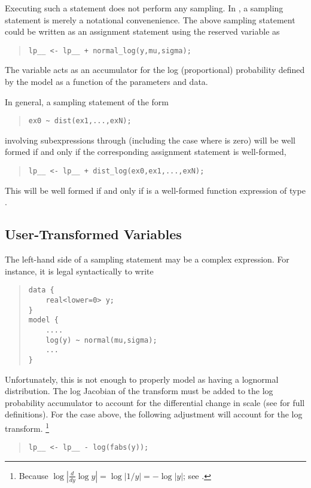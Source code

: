 Executing such a statement does not perform any sampling.  In \Stan, a
sampling statement is merely a notational convenenience.  The above
sampling statement could be written as an assignment statement using
the reserved variable  as
%
\begin{quote}
\begin{Verbatim}
lp__ <- lp__ + normal_log(y,mu,sigma);
\end{Verbatim}
\end{quote}
%
The variable  acts as an accumulator for the log
(proportional) probability defined by the model as a function of the
parameters and data.

In general, a sampling statement of the form
%
\begin{quote}
\begin{Verbatim}
ex0 ~ dist(ex1,...,exN);
\end{Verbatim}
\end{quote}
%
involving subexpressions  through  (including the
case where  is zero) will be well formed if and only if the
corresponding assignment statement is well-formed,
%
\begin{quote}
\begin{Verbatim}
lp__ <- lp__ + dist_log(ex0,ex1,...,exN);
\end{Verbatim}
\end{quote}
%
This will be well formed if and only if
 is a well-formed function expression
of type .

\subsection{User-Transformed Variables}

The left-hand side of a sampling statement may be a complex
expression.  For instance, it is legal syntactically to write
%
\begin{quote}
\begin{Verbatim}
data {
    real<lower=0> y;
}
model {
    ....
    log(y) ~ normal(mu,sigma);
    ...
}
\end{Verbatim}
\end{quote}
%
Unfortunately, this is not enough to properly model  as having
a lognormal distribution.  The log Jacobian of the transform must be
added to the log probability accumulator to account for the
differential change in scale (see  for
full definitions).  For the case above, the following adjustment will
account for the log transform.%
%
\footnote{Because $\log | \frac{d}{dy} \log y | = \log | 1/y | = - \log
  |y|$;  see .}
%
\begin{quote}
\begin{Verbatim}
lp__ <- lp__ - log(fabs(y));
\end{Verbatim}
\end{quote}
%

